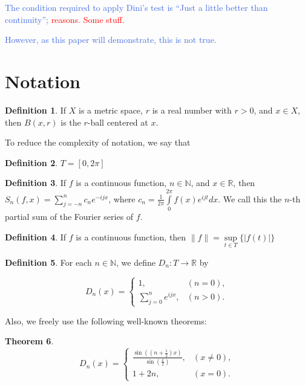 \documentclass{amsart}
\newcommand{\N}{\mathbb{N}}
\newcommand{\R}{\mathbb{R}}
\newcommand{\colorcomment}[2]{\textcolor{#1}{#2}} %
\newcommand{\absval}[1]{\lvert #1 \rvert}
\newcommand{\norm}[1]{\|#1\|}
\newtheorem{thm}{Theorem}[section]
\theoremstyle{definition}
\newtheorem{definition}[thm]{Definition}
\begin{document}
\colorcomment{RoyalBlue}{The condition required to apply Dini's test is ``Just a little better than continuity''; \colorcomment{red}{reasons}.
\colorcomment{red}{Some stuff.}}

\colorcomment{RoyalBlue}{However, as this paper will demonstrate, this is not true.}

\section{Notation}

\begin{definition}
If $X$ is a metric space, $r$ is a real number with $r>0$, and $x \in X$, then $B(x,r)$ is the $r$-ball centered at $x$.
\end{definition}

To reduce the complexity of notation, we say that

\begin{definition}
$T = [0, 2 \pi]$
\end{definition}

\begin{definition}
If $f$ is a continuous function, $n \in \N$, and $x \in \R$, then $S_n(f,x) = \sum\limits_{j=-n}^n c_n e^{-ijx}$, where $c_n = \frac{1}{2 \pi} \int\limits_0^{2\pi} f(x)e^{ijt} dx$. We call this the $n$-th partial sum of the Fourier series of $f$.
\end{definition}

\begin{definition}
If $f$ is a continuous function, then $\norm{f} = \sup\limits_{t \in T} \{\absval{f(t)}\}$
\end{definition}

\begin{definition}
For each $n \in \N$, we define $D_n: T \to \R$ by


\begin{displaymath}
   D_n(x) = \left\{
     \begin{array}{lr}
       1, &(n=0),\\
       \sum\limits_{j=0}^n e^{ijx}, &(n > 0).
     \end{array}
   \right.
\end{displaymath} 
\end{definition}

Also, we freely use the following well-known theorems:

\begin{thm}
\begin{displaymath}
   D_n(x) = \left\{
     \begin{array}{lr}
       \frac{\sin((n+\frac{1}{2})x)}{\sin(\frac{x}{2})}, &(x \neq 0),\\
       1+2n, &(x=0).
     \end{array}
   \right.
\end{displaymath}
\end{thm}
\end{document}
